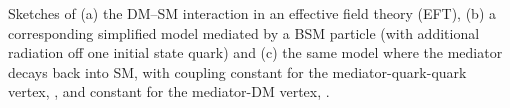 Sketches of (a) the DM--SM interaction in an effective field theory (EFT), (b) a corresponding simplified model mediated by a BSM particle (with additional radiation off one initial state quark) and (c) the same model where the mediator decays back into SM, with coupling constant for the mediator-quark-quark vertex, \gq, and constant for the mediator-DM vertex, \gdm.